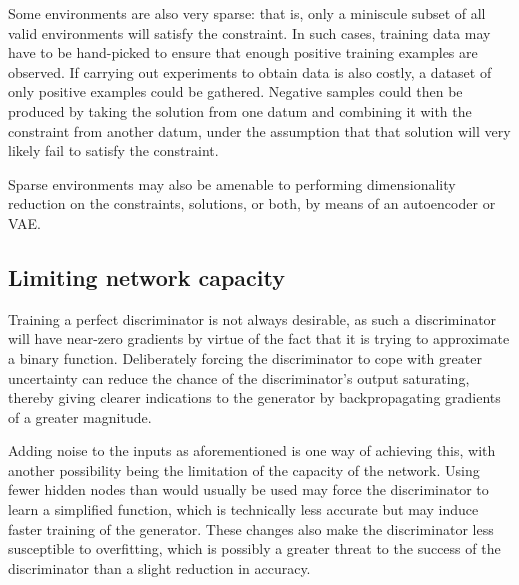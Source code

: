 \documentclass[../../main.tex]{subfiles}
\begin{document}
Some environments are also very sparse: that is, only a miniscule subset of all valid environments will satisfy the constraint.
In such cases, training data may have to be hand-picked to ensure that enough positive training examples are observed.
If carrying out experiments to obtain data is also costly, a dataset of only positive examples could be gathered.
Negative samples could then be produced by taking the solution from one datum and combining it with the constraint from another datum, under the assumption that that solution will very likely fail to satisfy the constraint.

Sparse environments may also be amenable to performing dimensionality reduction on the constraints, solutions, or both, by means of an autoencoder or VAE.

\subsection{Limiting network capacity} \label{subsection:limitingNetworkCapacity}

Training a perfect discriminator is not always desirable, as such a discriminator will have near-zero gradients by virtue of the fact that it is trying to approximate a binary function.
Deliberately forcing the discriminator to cope with greater uncertainty can reduce the chance of the discriminator's output saturating, thereby giving clearer indications to the generator by backpropagating gradients of a greater magnitude.

Adding noise to the inputs as aforementioned is one way of achieving this, with another possibility being the limitation of the capacity of the network.
Using fewer hidden nodes than would usually be used may force the discriminator to learn a simplified function, which is technically less accurate but may induce faster training of the generator.
These changes also make the discriminator less susceptible to overfitting, which is possibly a greater threat to the success of the discriminator than a slight reduction in accuracy.
\end{document}
